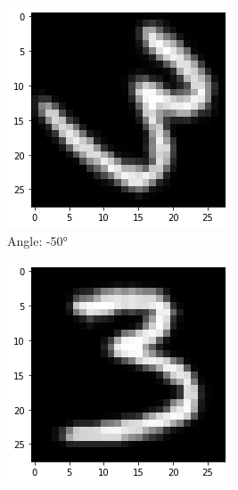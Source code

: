     \begin{figure}[!htbp]
        \centering
        \begin{subfigure}[b]{.3\textwidth}
            \centering
            \includegraphics[width=\linewidth]{images/rotate1.png}
            \caption{Angle: \ang{-50}}
            \label{fig:Rotate-misclass0}
        \end{subfigure}%
        \begin{subfigure}[b]{.3\textwidth}
            \centering
            \includegraphics[width=\textwidth]{images/rotate2.png}

\end{subfigure}
\end{figure}
